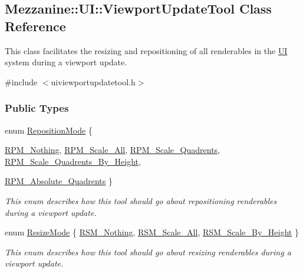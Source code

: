\hypertarget{classMezzanine_1_1UI_1_1ViewportUpdateTool}{
\subsection{Mezzanine::UI::ViewportUpdateTool Class Reference}
\label{classMezzanine_1_1UI_1_1ViewportUpdateTool}
}


This class facilitates the resizing and repositioning of all renderables in the \hyperlink{namespaceMezzanine_1_1UI}{UI} system during a viewport update.  




{\ttfamily \#include $<$uiviewportupdatetool.h$>$}

\subsubsection*{Public Types}
\begin{DoxyCompactItemize}
\item 
enum \hyperlink{classMezzanine_1_1UI_1_1ViewportUpdateTool_ad2de82a6fc57859d914845ce676ff67e}{RepositionMode} \{ \par
\hyperlink{classMezzanine_1_1UI_1_1ViewportUpdateTool_ad2de82a6fc57859d914845ce676ff67eafb9556e4bf207e5b7becd3c289e75fea}{RPM\_\-Nothing}, 
\hyperlink{classMezzanine_1_1UI_1_1ViewportUpdateTool_ad2de82a6fc57859d914845ce676ff67ea33c6541a0f70ab3e2476b46d1535245f}{RPM\_\-Scale\_\-All}, 
\hyperlink{classMezzanine_1_1UI_1_1ViewportUpdateTool_ad2de82a6fc57859d914845ce676ff67ea51d39aa6ec3379a02ef3e78d4f01d606}{RPM\_\-Scale\_\-Quadrents}, 
\hyperlink{classMezzanine_1_1UI_1_1ViewportUpdateTool_ad2de82a6fc57859d914845ce676ff67ea5689ccb5755157c9a3fb8088ba89bbf2}{RPM\_\-Scale\_\-Quadrents\_\-By\_\-Height}, 
\par
\hyperlink{classMezzanine_1_1UI_1_1ViewportUpdateTool_ad2de82a6fc57859d914845ce676ff67eaad6d1e0cde23b744226a1ae7548eedee}{RPM\_\-Absolute\_\-Quadrents}
 \}
\begin{DoxyCompactList}\small\item\em This enum describes how this tool should go about repositioning renderables during a viewport update. \item\end{DoxyCompactList}\item 
enum \hyperlink{classMezzanine_1_1UI_1_1ViewportUpdateTool_a89afdf79f52d5bf18bdffd323911a549}{ResizeMode} \{ \hyperlink{classMezzanine_1_1UI_1_1ViewportUpdateTool_a89afdf79f52d5bf18bdffd323911a549a77824658882b505ec5978c19e9574e44}{RSM\_\-Nothing}, 
\hyperlink{classMezzanine_1_1UI_1_1ViewportUpdateTool_a89afdf79f52d5bf18bdffd323911a549a7413c57854615f51a7006b6f194abe6a}{RSM\_\-Scale\_\-All}, 
\hyperlink{classMezzanine_1_1UI_1_1ViewportUpdateTool_a89afdf79f52d5bf18bdffd323911a549ad193419c02db76a644032f0e56040a6c}{RSM\_\-Scale\_\-By\_\-Height}
 \}
\begin{DoxyCompactList}\small\item\em This enum describes how this tool should go about resizing renderables during a viewport update. \item\end{DoxyCompactList}\end{DoxyCompactItemize}

